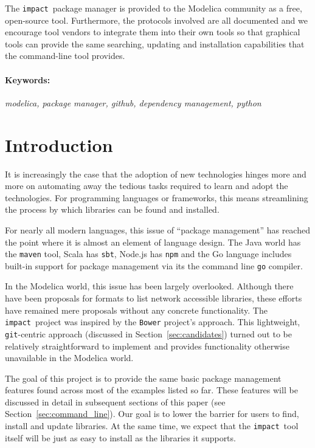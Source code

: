 \documentclass[11pt,a4paper,twocolumn]{article}
\newcommand{\impact}{\texttt{impact}} %
\newcommand{\code}[1]{\texttt{#1}} %
\begin{document}
The \impact\ package manager is provided to the Modelica community as
a free, open-source tool.  Furthermore, the protocols involved are all
documented and we encourage tool vendors to integrate them into their
own tools so that graphical tools can provide the same searching,
updating and installation capabilities that the command-line tool
provides.

\paragraph{Keywords:}
\emph{modelica, package manager, github, dependency management, python}

\section{Introduction}
\label{sec:intro}

It is increasingly the case that the adoption of new technologies
hinges more and more on automating away the tedious tasks required to
learn and adopt the technologies.  For programming languages or
frameworks, this means streamlining the process by which libraries can
be found and installed.

For nearly all modern languages, this issue of ``package management''
has reached the point where it is almost an element of language
design.  The Java world has the \code{maven} tool, Scala has
\code{sbt}, Node.js has \code{npm} and the Go language includes
built-in support for package management via its the command line
\code{go} compiler.

In the Modelica world, this issue has been largely overlooked.
Although there have been proposals for formats to list network
accessible libraries, these efforts have remained mere proposals
without any concrete functionality.  The \impact\ project was inspired
by the \code{Bower}\cite{Bower} project's approach.  This lightweight,
\code{git}-centric approach (discussed in Section~\ref{sec:candidates})
turned out to be relatively straightforward to implement and provides
functionality otherwise unavailable in the Modelica world.

The goal of this project is to provide the same basic package
management features found across most of the examples listed so far.
These features will be discussed in detail in subsequent sections of
this paper (see Section~\ref{sec:command_line}).  Our goal is to lower
the barrier for users to find, install and update libraries.  At the
same time, we expect that the \impact\ tool itself will be just as
easy to install as the libraries it supports.
\end{document}

